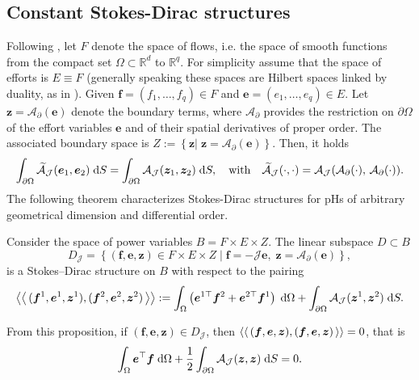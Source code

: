 \subsection{Constant Stokes-Dirac structures}
Following \cite{macchelli2004modelling}, let ${F}$ denote the space of flows, i.e. the space of smooth functions from the compact set $\Omega \subset \mathbb{R}^d$ to $\mathbb{R}^q$. For simplicity assume that  the space of efforts is ${E} \equiv {F}$ (generally speaking these spaces are Hilbert spaces linked by duality, as in \cite{villegas2007}). Given $\bm{f} = (f_1, \dots, f_q) \in {F}$ and $\bm{e} = (e_1, \dots, e_q) \in {E}$. Let $\bm{z} = \mathcal{A}_\partial(\bm{e})$ denote the boundary terms, where $\mathcal{A}_\partial$ provides the restriction on $\partial\Omega$ of the effort variables $\bm{e}$ and of their spatial derivatives of proper order. The associated boundary space is ${Z} := \left\{ \bm{z} \vert \; \bm{z} = \mathcal{A}_{\partial}(\bm{e})  \right\}$. Then, it holds
\begin{equation}
\int_{\partial \Omega} \widetilde{\mathcal{A}}_{\mathcal{J}}(\bm{e}_1, \bm{e}_2) \d{S} = \int_{\partial \Omega} \mathcal{A}_{\mathcal{J}}(\bm{z}_1, \bm{z}_2) \d{S}, \quad \text{with} \quad  \widetilde{\mathcal{A}}_\mathcal{J}(\cdot, \cdot) = \mathcal{A}_{\mathcal{J}}(\mathcal{A}_{\partial}(\cdot), \, \mathcal{A}_{\partial}(\cdot)).
\end{equation}
The following theorem characterizes Stokes-Dirac structures for pHs of arbitrary geometrical dimension and differential order.
\begin{proposition}
	\label{prop:StokesDirac}
	
	Consider the space of power variables ${B} = {F} \times {E} \times {Z}$. The linear subspace ${D} \subset {B}$
	\begin{equation}
	{D}_{\mathcal{J}} = \left\{ (\bm{f}, \bm{e}, \bm{z}) \in  {F} \times {E} \times {Z} \; \vert \; \bm{f} = -\mathcal{J} \bm{e}, \; \bm{z} = \mathcal{A}_\partial(\bm{e}) \right\},
	\end{equation}
	is a Stokes–Dirac structure on $B$ with respect to the pairing
	\begin{equation}
	\bilprod{(\bm{f}^1, \bm{e}^1, \bm{z}^1)}{(\bm{f}^2, \bm{e}^2, \bm{z}^2)}  := \int_{\Omega} \left( \bm{e}^{1 \top} \bm{f}^ 2 + \bm{e}^{2 \top} \bm{f}^1 \right) \d\Omega + \int_{\partial \Omega} \mathcal{A}_{\mathcal{J}}(\bm{z}^1, \bm{z}^2) \d{S}.
	\end{equation}
\end{proposition}
From this proposition, if $(\bm{f}, \bm{e}, \bm{z}) \in  D_{\mathcal{J}}$, then $\left\langle \left\langle \, (\bm{f}, \bm{e}, \bm{z}), (\bm{f}, \bm{e}, \bm{z}) \, \right\rangle \right\rangle=0$, that is
\begin{equation}\label{eq:enbalstr}
\int_{\Omega} \bm{e}^\top \bm{f}  \d\Omega + \frac{1}{2} \int_{\partial \Omega} \mathcal{A}_{\mathcal{J}}(\bm{z}, \bm{z}) \d{S} = 0.
\end{equation}


